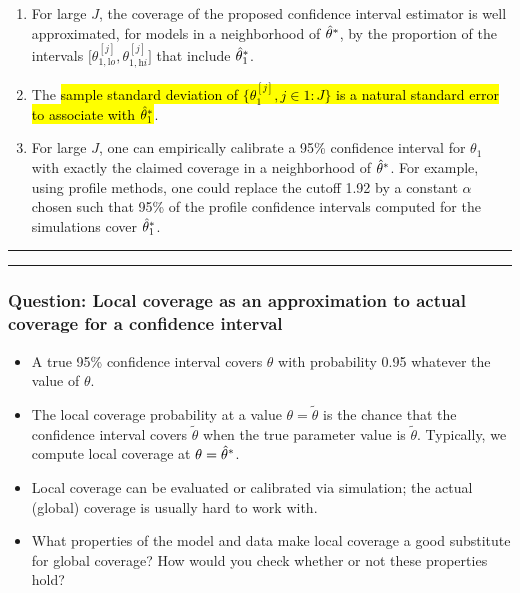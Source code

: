 \documentclass[]{article}
\providecommand{\tightlist}{%
  \setlength{\itemsep}{0pt}\setlength{\parskip}{0pt}}
\begin{document}
\begin{enumerate}
\def\labelenumi{(\Alph{enumi})}
\tightlist
\item
  For large \(J\), the coverage of the proposed confidence interval
  estimator is well approximated, for models in a neighborhood of
  \(\hat\theta^*\), by the proportion of the intervals
  \(\big[\theta^{[j]}_{1,\mathrm lo},\theta^{[j]}_{1,\mathrm hi}\big]\)
  that include \(\hat\theta_1^*\). 
\item
  The \hl{sample standard deviation of $\{ \theta^{[j]}_1, j\in 1:J\}$ is
  a natural standard error to associate with
  $\hat \theta_1^*$}. 
\item
  For large \(J\), one can empirically calibrate a 95\% confidence
  interval for \(\theta_1\) with exactly the claimed coverage in a
  neighborhood of \(\hat\theta^*\). For example, using profile
  methods, one could replace the cutoff 1.92 by a constant \(\alpha\)
  chosen such that 95\% of the profile confidence intervals computed for
  the simulations cover \(\hat\theta_1^*\).
\end{enumerate}

\begin{center}\rule{0.5\linewidth}{\linethickness}\end{center}

\begin{center}\rule{0.5\linewidth}{\linethickness}\end{center}

\subsubsection{Question: Local coverage as an approximation to actual
coverage for a confidence
interval}\label{question-local-coverage-as-an-approximation-to-actual-coverage-for-a-confidence-interval}

\begin{itemize}
\item
  A true 95\% confidence interval covers \(\theta\) with probability
  0.95 whatever the value of \(\theta\).
\item
  The local coverage probability at a value \(\theta=\tilde\theta\) is
  the chance that the confidence interval covers \(\tilde\theta\) when
  the true parameter value is \(\tilde\theta\). Typically, we compute
  local coverage at \(\theta=\hat\theta^*\).
\item
  Local coverage can be evaluated or calibrated via simulation; the
  actual (global) coverage is usually hard to work with.
\item
  What properties of the model and data make local coverage a good
  substitute for global coverage? How would you check whether or not
  these properties hold?
\end{itemize}
\end{document}
